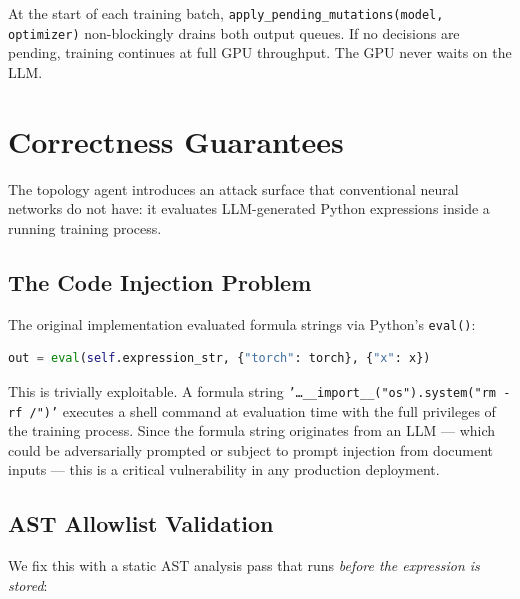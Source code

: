 \documentclass[11pt,a4paper]{article}
\begin{document}
At the start of each training batch, \texttt{apply\_pending\_mutations(model, optimizer)}
non-blockingly drains both output queues. If no decisions are pending, training
continues at full GPU throughput. The GPU never waits on the LLM.

\section{Correctness Guarantees}
\label{sec:security}

The topology agent introduces an attack surface that conventional neural networks do not
have: it evaluates LLM-generated Python expressions inside a running training process.

\subsection{The Code Injection Problem}

The original implementation evaluated formula strings via Python's \texttt{eval()}:
\begin{lstlisting}[language=Python]
out = eval(self.expression_str, {"torch": torch}, {"x": x})
\end{lstlisting}
This is trivially exploitable. A formula string
\texttt{'\ldots\_\_import\_\_("os").system("rm -rf /")'} executes a shell command at
evaluation time with the full privileges of the training process. Since the formula
string originates from an LLM --- which could be adversarially prompted or subject to
prompt injection from document inputs --- this is a critical vulnerability in any
production deployment.

\subsection{AST Allowlist Validation}

We fix this with a static AST analysis pass that runs \emph{before the expression is
stored}:
\end{document}
